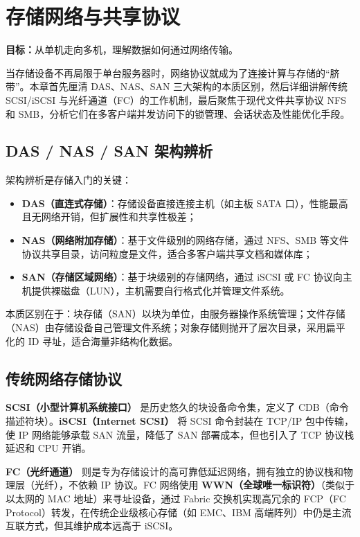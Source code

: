 \documentclass[12pt,UTF8]{ctexbook}
\begin{document}
	\chapter{存储网络与共享协议}
	\textbf{目标：}从单机走向多机，理解数据如何通过网络传输。
	
	当存储设备不再局限于单台服务器时，网络协议就成为了连接计算与存储的“脐带”。本章首先厘清 DAS、NAS、SAN 三大架构的本质区别，然后详细讲解传统 SCSI/iSCSI 与光纤通道（FC）的工作机制，最后聚焦于现代文件共享协议 NFS 和 SMB，分析它们在多客户端并发访问下的锁管理、会话状态及性能优化手段。
	
	\section{DAS / NAS / SAN 架构辨析}
	
	架构辨析是存储入门的关键：
	\begin{itemize}
		\item \textbf{DAS（直连式存储）}：存储设备直接连接主机（如主板 SATA 口），性能最高且无网络开销，但扩展性和共享性极差；
		\item \textbf{NAS（网络附加存储）}：基于文件级别的网络存储，通过 NFS、SMB 等文件协议共享目录，访问粒度是文件，适合多客户端共享文档和媒体库；
		\item \textbf{SAN（存储区域网络）}：基于块级别的存储网络，通过 iSCSI 或 FC 协议向主机提供裸磁盘（LUN），主机需要自行格式化并管理文件系统。
	\end{itemize}
	本质区别在于：块存储（SAN）以块为单位，由服务器操作系统管理；文件存储（NAS）由存储设备自己管理文件系统；对象存储则抛开了层次目录，采用扁平化的 ID 寻址，适合海量非结构化数据。
	
	\section{传统网络存储协议}
	
	\textbf{SCSI（小型计算机系统接口）} 是历史悠久的块设备命令集，定义了 CDB（命令描述符块）。\textbf{iSCSI（Internet SCSI）} 将 SCSI 命令封装在 TCP/IP 包中传输，使 IP 网络能够承载 SAN 流量，降低了 SAN 部署成本，但也引入了 TCP 协议栈延迟和 CPU 开销。
	
	\textbf{FC（光纤通道）} 则是专为存储设计的高可靠低延迟网络，拥有独立的协议栈和物理层（光纤），不依赖 IP 协议。FC 网络使用 \textbf{WWN（全球唯一标识符）}（类似于以太网的 MAC 地址）来寻址设备，通过 Fabric 交换机实现高冗余的 FCP（FC Protocol）转发，在传统企业级核心存储（如 EMC、IBM 高端阵列）中仍是主流互联方式，但其维护成本远高于 iSCSI。
	
\end{document}
